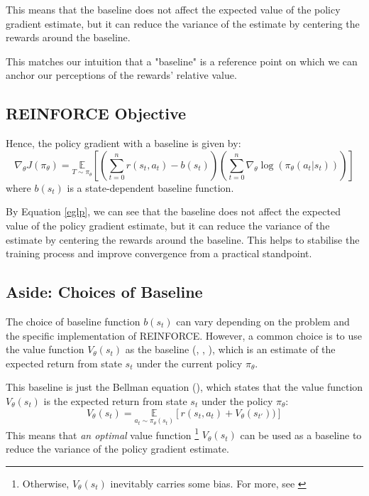 \documentclass{article} %
\begin{document}
This means that the baseline does not affect the expected value of the policy gradient estimate,
but it can reduce the variance of the estimate by centering the rewards around the baseline.

This matches our intuition that a "baseline" is a reference point on which we can anchor
our perceptions of the rewards' relative value. 

\subsection{REINFORCE Objective}

Hence, the policy gradient with a baseline is given by:
\begin{equation} \label{policy_gradient_baseline}
    \nabla_\theta J(\pi_\theta) = \underset{T \sim \pi_\theta}{\mathbb{E}} \left[\left(\sum_{t=0}^{n} r(s_t, a_t) - b(s_t) \right)  \left(\sum_{t=0}^{n} \nabla_\theta \log(\pi_\theta(a_t | s_t))\right) \right]
\end{equation}
where $b(s_t)$ is a state-dependent baseline function.

By Equation \eqref{eglp}, we can see that the baseline does not affect the expected value of the policy gradient estimate,
but it can reduce the variance of the estimate by centering the rewards around the baseline.
This helps to stabilise the training process and improve convergence from a practical standpoint.

\subsection{Aside: Choices of Baseline}
The choice of baseline function $b(s_t)$ can vary depending on the problem and the specific implementation of REINFORCE.
However, a common choice is to use the value function $V_\theta(s_t)$ as the baseline (\cite{SpinningUp-2018}, \cite{Sutton-and-Barto-1998}, \cite{Weng-2018}), which is an estimate of the expected return from state $s_t$ under the current policy $\pi_\theta$.

This baseline is just the Bellman equation (\cite{Sutton-and-Barto-1998}), which states that the value function $V_\theta(s_t)$ is the expected return from state $s_t$ under the policy $\pi_\theta$:
\begin{equation} \label{value_function}
    V_\theta(s_t) = \underset{a_t \sim \pi_\theta(s_t)}{\mathbb{E}} \left[ r(s_t, a_t) + V_\theta(s_{t'})) \right]
\end{equation}
This means that \textit{an optimal} value function \footnote{Otherwise, $V_\theta(s_t)$ inevitably carries some bias. For more, see \cite{Schulman-et-al-2016}} 
$V_\theta(s_t)$ can be used as a baseline to reduce the variance of the policy gradient estimate.
\end{document}
